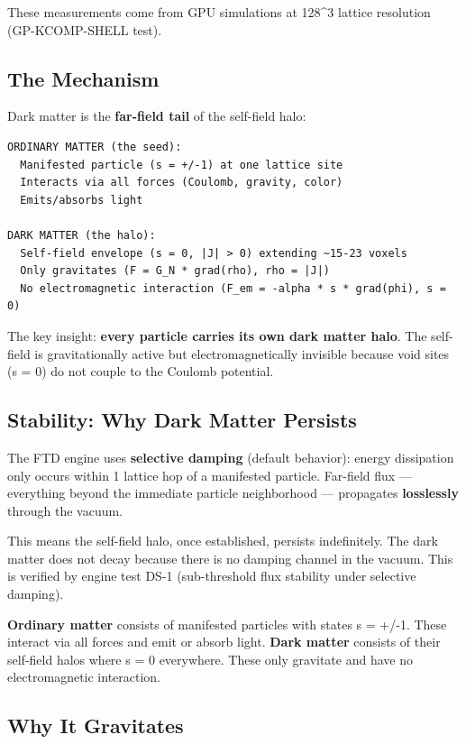 \documentclass[
  11pt,
  letterpaper,
  twoside,
  openright]{book}
\begin{document}
These measurements come from GPU simulations at 128\^{}3 lattice
resolution (GP-KCOMP-SHELL test).

\subsection{The Mechanism}\label{the-mechanism}

Dark matter is the \textbf{far-field tail} of the self-field halo:

\begin{verbatim}
ORDINARY MATTER (the seed):
  Manifested particle (s = +/-1) at one lattice site
  Interacts via all forces (Coulomb, gravity, color)
  Emits/absorbs light

DARK MATTER (the halo):
  Self-field envelope (s = 0, |J| > 0) extending ~15-23 voxels
  Only gravitates (F = G_N * grad(rho), rho = |J|)
  No electromagnetic interaction (F_em = -alpha * s * grad(phi), s = 0)
\end{verbatim}

The key insight: \textbf{every particle carries its own dark matter
halo}. The self-field is gravitationally active but electromagnetically
invisible because void sites (s = 0) do not couple to the Coulomb
potential.

\subsection{Stability: Why Dark Matter
Persists}\label{stability-why-dark-matter-persists}

The FTD engine uses \textbf{selective damping} (default behavior):
energy dissipation only occurs within 1 lattice hop of a manifested
particle. Far-field flux --- everything beyond the immediate particle
neighborhood --- propagates \textbf{losslessly} through the vacuum.

This means the self-field halo, once established, persists indefinitely.
The dark matter does not decay because there is no damping channel in
the vacuum. This is verified by engine test DS-1 (sub-threshold flux
stability under selective damping).

\textbf{Ordinary matter} consists of manifested particles with states s
= +/-1. These interact via all forces and emit or absorb light.
\textbf{Dark matter} consists of their self-field halos where s = 0
everywhere. These only gravitate and have no electromagnetic
interaction.

\subsection{Why It Gravitates}\label{why-it-gravitates}
\end{document}
